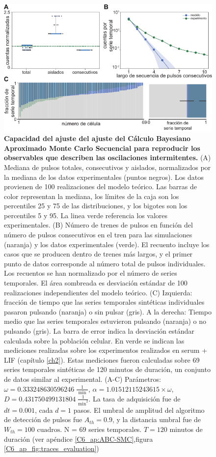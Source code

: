 \documentclass[./main.tex]{subfiles}
\begin{document}
\begin{figure}
    \centering
    \includegraphics[width=1\columnwidth]{figures/chapter6/C6_param_evaluation.pdf} 
    \caption{\textbf{Capacidad del ajuste del ajuste del Cálculo Bayesiano Aproximado Monte Carlo Secuencial para reproducir los observables que describen las oscilaciones intermitentes.} (A)  Mediana de pulsos totales, consecutivos y aislados, normalizados por la mediana de los datos experimentales (puntos negros). Los datos provienen de 100 realizaciones del modelo teórico. Las barras de color representan la mediana, los límites de la caja son los percentiles 25 y 75 de las distribuciones, y los bigotes son los percentiles 5 y 95. La linea verde referencia los valores experimentales. (B) Número de trenes de pulsos en función del número de pulsos consecutivos en el tren para las simulaciones (naranja) y los datos experimentales (verde). El recuento incluye los casos que se producen dentro de trenes más largos, y el primer punto de datos corresponde al número total de pulsos individuales. Los recuentos se han normalizado por el número de series temporales. El área sombreada es desviación estándar de 100 realizaciones independientes del modelo teórico. (C) Izquierda: fracción de tiempo que las series temporales sintéticas individuales pasaron pulsando (naranja) o sin pulsar (gris). A la derecha: Tiempo medio que las series temporales estuvieron pulsando (naranja) o no pulsando (gris). La barra de error indica la desviación estándar calculada sobre la población celular. En verde se indican las mediciones realizadas sobre los experimentos realizados en serum + LIF (capítulo \ref{ch2}). Estas mediciones fueron calculadas sobre 69 series temporales sintéticas de 120 minutos de duración, un conjunto de datos similar al experimental. (A-C) Parámetros:  $\omega = 0.333248630596246\;\frac{1}{\text{ min }}$, $\alpha = 1.01512115243615 \times \omega$, $ D = 0.431750499131804 \; \frac{1}{\text{min}^2}$. La tasa de adquisición fue de $dt = 0.001$, cada $d = 1$ pasos. El umbral de amplitud del algoritmo de detección de pulsos fue $A_{th} = 0.9$, y la distancia umbral fue de $W_{th} = 100\text{ cuadros}$. N = $69$ series temporales. $T = 120$ minutos de duración (ver apéndice \ref{C6_ap:ABC-SMC},figura \ref{C6_ap_fig:traces_evaluation})}
    \label{C6_fig:param_evaluation}
\end{figure} 
\end{document}
